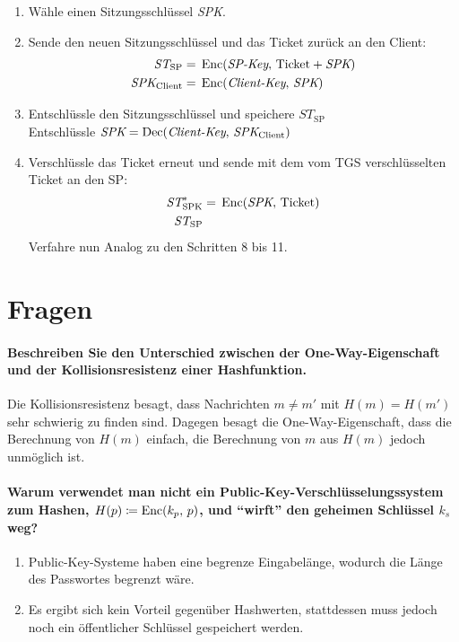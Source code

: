 \begin{enumerate}
			    \item Wähle einen Sitzungsschlüssel \textit{SPK}.
			    \item Sende den neuen Sitzungsschlüssel und das Ticket zurück an den Client:
				    \begin{align*}
				    	\textit{ST}_\textrm{SP}      & =\, \textrm{Enc}(\textit{SP-Key},\, \textrm{Ticket}+\textit{SPK}) \\
				    	\textit{SPK}_\textrm{Client} & =\, \textrm{Enc}(\textit{Client-Key},\, \textit{SPK})
				    \end{align*}
				\item Entschlüssle den Sitzungsschlüssel und speichere \( \textit{ST}_\textrm{SP} \) \\ Entschlüssle \( \textit{SPK} = \textrm{Dec}(\textit{Client-Key},\, \textit{SPK}_\textrm{Client}) \)
				\item Verschlüssle das Ticket erneut und sende mit dem vom TGS verschlüsselten Ticket an den SP:
					\begin{align*}
						\textit{ST}^*_\textrm{SPK} & =\, \textrm{Enc}(\textit{SPK},\, \textrm{Ticket}) \\
						\textit{ST}_\textrm{SP}    &
					\end{align*}
					Verfahre nun Analog zu den Schritten 8 bis 11.
            \end{enumerate}

    \section{Fragen} %
		\paragraph{Beschreiben Sie den Unterschied zwischen der One-Way-Eigenschaft und der Kollisionsresistenz einer Hashfunktion.}
		Die Kollisionsresistenz besagt, dass Nachrichten \( m \neq m' \) mit \( H(m) = H(m') \) sehr schwierig zu finden sind. Dagegen besagt die One-Way-Eigenschaft, dass die Berechnung von \( H(m) \) einfach, die Berechnung von \(m\) aus \(H(m)\) jedoch unmöglich ist.
		
		\paragraph{Warum verwendet man nicht ein Public-Key-Verschlüsselungssystem zum Hashen, \(H(p) \coloneqq \textrm{Enc}(k_p,\, p) \), und \enquote{wirft} den geheimen Schlüssel \(k_s\) weg?}
		\begin{enumerate}
			\item Public-Key-Systeme haben eine begrenze Eingabelänge, wodurch die Länge des Passwortes begrenzt wäre.
			\item Es ergibt sich kein Vorteil gegenüber Hashwerten, stattdessen muss jedoch noch ein öffentlicher Schlüssel gespeichert werden.
		\end{enumerate}
		
